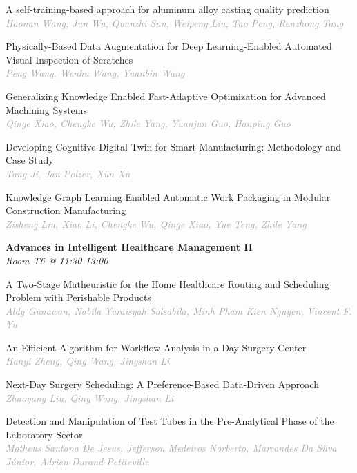 \begin{multicols*}{2}
\small A self-training-based approach for aluminum alloy casting quality prediction\\ 
\footnotesize \textcolor{darkgray}{\textit{Haonan Wang, Jun  Wu, Quanzhi  Sun, Weipeng  Liu, Tao  Peng, Renzhong  Tang}}

\small Physically-Based Data Augmentation for Deep Learning-Enabled Automated Visual Inspection of Scratches\\ 
\footnotesize \textcolor{darkgray}{\textit{Peng Wang, Wenhu  Wang, Yuanbin  Wang}}

\small Generalizing Knowledge Enabled Fast-Adaptive Optimization for Advanced Machining Systems\\ 
\footnotesize \textcolor{darkgray}{\textit{Qinge Xiao, Chengke  Wu, Zhile  Yang, Yuanjun  Guo, Hanping  Guo}}

\small Developing Cognitive Digital Twin for Smart Manufacturing: Methodology and Case Study\\ 
\footnotesize \textcolor{darkgray}{\textit{Tang Ji, Jan  Polzer, Xun  Xu}}

\small Knowledge Graph Learning Enabled Automatic Work Packaging in Modular Construction Manufacturing\\ 
\footnotesize \textcolor{darkgray}{\textit{Zisheng Liu, Xiao  Li, Chengke  Wu, Qinge  Xiao, Yue  Teng, Zhile  Yang}}

\normalsize \textbf{Advances in Intelligent Healthcare Management II}\\
\small \textit{Room T6 @ 11:30-13:00}

\small A Two-Stage Matheuristic for the Home Healthcare Routing and Scheduling Problem with Perishable Products\\ 
\footnotesize \textcolor{darkgray}{\textit{Aldy Gunawan, Nabila Yuraisyah  Salsabila, Minh Pham Kien  Nguyen, Vincent F.  Yu}}

\small An Efficient Algorithm for Workflow Analysis in a Day Surgery Center\\ 
\footnotesize \textcolor{darkgray}{\textit{Hanyi Zheng, Qing  Wang, Jingshan  Li}}

\small Next-Day Surgery Scheduling: A Preference-Based Data-Driven Approach\\ 
\footnotesize \textcolor{darkgray}{\textit{Zhaoyang Liu, Qing  Wang, Jingshan  Li}}

\small Detection and Manipulation of Test Tubes in the Pre-Analytical Phase of the Laboratory Sector\\ 
\footnotesize \textcolor{darkgray}{\textit{Matheus Santana De Jesus, Jefferson Medeiros  Norberto, Marcondes  Da Silva Júnior, Adrien  Durand-Petiteville}}


\end{multicols*}
